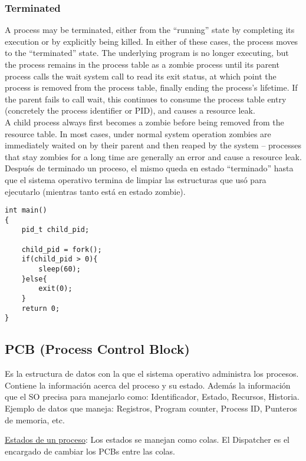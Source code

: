 \documentclass[a4paper, twoside]{article}
\begin{document}
\subsubsection{Terminated}
A process may be terminated, either from the ``running'' state by completing its execution or by explicitly being killed. In either of these cases, the process moves to the ``terminated'' state. The underlying program is no longer executing, but the process remains in the process table as a zombie process until its parent process calls the wait system call to read its exit status, at which point the process is removed from the process table, finally ending the process's lifetime. If the parent fails to call wait, this continues to consume the process table entry (concretely the process identifier or PID), and causes a resource leak.\\

A child process always first becomes a zombie before being removed from the resource table. In most cases, under normal system operation zombies are immediately waited on by their parent and then reaped by the system – processes that stay zombies for a long time are generally an error and cause a resource leak.\\

Después de terminado un proceso, el mismo queda en estado ``terminado'' hasta que el sistema operativo termina de limpiar las estructuras que usó para ejecutarlo (mientras tanto está en estado zombie).

\begin{lstlisting}
int main()
{
	pid_t child_pid;

	child_pid = fork();
	if(child_pid > 0){
		sleep(60);
	}else{
		exit(0);
	}
	return 0;
}
\end{lstlisting}

\subsection{PCB (Process Control Block)}
Es la estructura de datos con la que el sistema operativo administra los procesos.
Contiene la información acerca del proceso y su estado.
Además la información que el SO precisa para manejarlo como: Identificador, Estado, Recursos, Historia.
Ejemplo de datos que maneja: Registros, Program counter, Process ID, Punteros de memoria, etc.

\underline{Estados de un proceso}:
Los estados se manejan como colas.
El Dispatcher es el encargado de cambiar los PCBs entre las colas.
\end{document}
